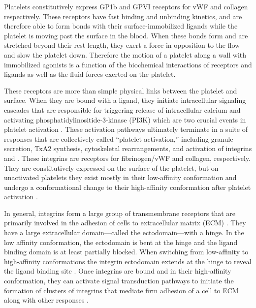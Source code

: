 Platelets constitutively express GP1b and GPVI receptors for vWF and
collagen respectively. These receptors have fast binding and unbinding
kinetics, and are therefore able to form bonds with their
surface-immobilized ligands while the platelet is moving past the
surface in the blood. When these bonds form and are stretched beyond
their rest length, they exert a force in opposition to the flow and
slow the platelet down. Therefore the motion of a platelet along a
wall with immobilized agonists is a function of the biochemical
interactions of receptors and ligands as well as the fluid forces
exerted on the platelet.
		
These receptors are more than simple physical links between the
platelet and surface. When they are bound with a ligand, they initiate
intracellular signaling cascades that are responsible for triggering
release of intracellular calcium and activating
phosphatidylinositide-3-kinase (PI3K) which are two crucial events in
platelet activation \cite{Bye2016,Du2007,Senis2014}. These activation
pathways ultimately terminate in a suite of responses that are
collectively called ``platelet activation,'' including granule
secretion, TxA2 synthesis, cytoskeletal rearrangements, and activation
of integrins  and . These integrins are
receptors for fibrinogen/vWF and collagen, respectively. They are
constitutively expressed on the surface of the platelet, but on
unactivated platelets they exist mostly in their low-affinity
conformation and undergo a conformational change to their
high-affinity conformation after platelet activation
\cite{Qiu2015,Shattil1998,Shattil2010}.
		
In general, integrins form a large group of transmembrane receptors
that are primarily involved in the adhesion of cells to extracellular
matrix (ECM) \cite{Giancotti1999}. They have a large extracellular
domain---called the ectodomain---with a hinge. In the low affinity
conformation, the ectodomain is bent at the hinge and the ligand
binding domain is at least partially blocked. When switching from
low-affinity to high-affinity conformations the integrin ectodomain
extends at the hinge to reveal the ligand binding site
\cite{Campbell2011,Qiu2015,Shattil1998}. Once integrins are bound and
in their high-affinity conformation, they can activate signal
transduction pathways to initiate the formation of clusters of
integrins that mediate firm adhesion of a cell to ECM along with other
responses \cite{Hynes2002,Li2010,Shattil1998,Shattil2010}.

